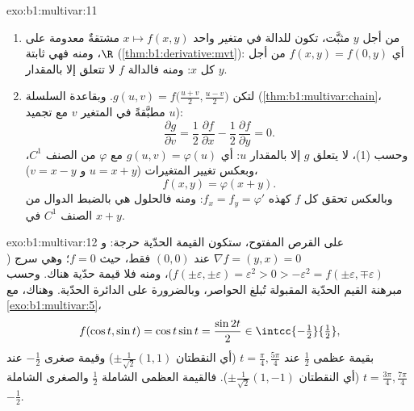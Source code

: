 \begin{solution}{exo:b1:multivar:11}
\begin{enumerate}
  \item من أجل $y$ مثبَّت، تكون للدالة في متغير واحد $x \mapsto
        f(x,y)$ مشتقةٌ معدومة على $\R$، ومنه فهي ثابتة
        (\cref{thm:b1:derivative:mvt}): أي $f(x, y) = f(0, y)$ من أجل
        كل $x$: ومنه فالدالة $f$ لا تتعلق إلا بالمقدار $y$.
  \item لتكن $g(u, v) = f\bigl(\frac{u+v}2, \frac{u-v}2\bigr)$.
        وبقاعدة السلسلة (\cref{thm:b1:multivar:chain}، مطبَّقةً
        في المتغير $v$ مع تجميد $u$):
        \[
        \frac{\partial g}{\partial v}
        = \frac12\,\frac{\partial f}{\partial x}
        - \frac12\,\frac{\partial f}{\partial y} = 0 .
        \]
        وحسب (1)، لا يتعلق $g$ إلا بالمقدار $u$: أي $g(u, v) = \varphi(u)$
        مع $\varphi$ من الصنف $C^1$، وبعكس تغيير
        المتغيرات ($u = x + y$ و $v = x - y$)،
        \[
        f(x, y) = \varphi(x + y).
        \]
        وبالعكس تحقق كل $f$ كهذه $f_x = f_y =
        \varphi'$: ومنه فالحلول هي بالضبط الدوال من الصنف $C^1$
        في $x + y$.
\end{enumerate}
\end{solution}

\begin{solution}{exo:b1:multivar:12}
على القرص المفتوح، ستكون القيمة الحدّية حرجة: و $\nabla f = (y,
x) = 0$ عند $(0,0)$ فقط، حيث $f = 0$؛ وهي سرج ($f(\pm
\varepsilon, \pm\varepsilon) = \varepsilon^2 > 0 > -\varepsilon^2
= f(\pm\varepsilon, \mp\varepsilon)$)، ومنه فلا قيمة حدّية هناك. وحسب
مبرهنة القيم الحدّية المقبولة تُبلغ الحواصر،
وبالضرورة على الدائرة الحدّية. وهناك، مع
\cref{exo:b1:multivar:5}،
\[
f(\cos t, \sin t) = \cos t\sin t = \frac{\sin 2t}{2}
\in \intcc{-\tfrac12}{\tfrac12},
\]
بقيمة عظمى $\frac12$ عند $t = \frac\pi4, \frac{5\pi}4$ (أي النقطتان
$\pm\frac{1}{\sqrt2}(1,1)$) وقيمة صغرى $-\frac12$ عند $t =
\frac{3\pi}4, \frac{7\pi}4$ (أي النقطتان $\pm\frac{1}{\sqrt2}(1,-1)$).
فالقيمة العظمى الشاملة $\frac12$ والصغرى الشاملة $-\frac12$.
\end{solution}

